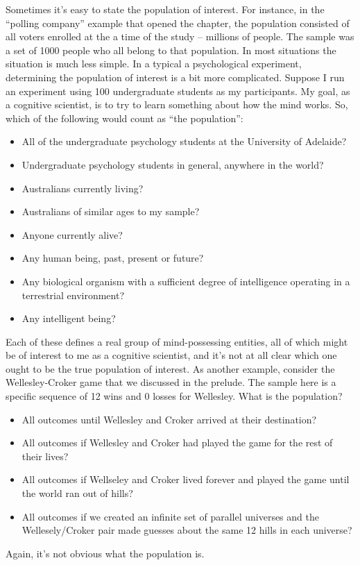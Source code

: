 Sometimes it's easy to state the population of interest. For instance, in the ``polling company'' example that opened the chapter, the population consisted of all  voters enrolled at the a time of the study -- millions of people. The sample was a set of 1000 people who all belong to that population. In most situations the situation is much less simple. In a typical a psychological experiment, determining the population of interest is a bit more complicated. Suppose I run an experiment using 100 undergraduate students as my participants. My goal, as a cognitive scientist, is to try to learn something about how the mind works. So, which of the following would count as ``the population'':
\begin{itemize} \itemsep -2pt
\item All of the undergraduate psychology students at the University of Adelaide?
\item Undergraduate psychology students in general, anywhere in the world?
\item Australians currently living?
\item Australians of similar ages to my sample?
\item Anyone currently alive?
\item Any human being, past, present or future?
\item Any biological organism with a sufficient degree of intelligence operating in a terrestrial environment?
\item Any intelligent being?
\end{itemize}
Each of these defines a real group of mind-possessing entities, all of which might be of interest to me as a cognitive scientist, and it's not at all clear which one ought to be the true population of interest. As another example, consider the Wellesley-Croker game that we discussed in the prelude. The sample here is a specific sequence of 12 wins and 0 losses for Wellesley. What is the population?
\begin{itemize} \itemsep -2pt
\item All outcomes until Wellesley and Croker arrived at their destination?
\item All outcomes if Wellesley and Croker had played the game for the rest of their lives?
\item All outcomes if Wellseley and Croker lived forever and played the game until the world ran out of hills?
\item All outcomes if we created an infinite set of parallel universes and the Wellesely/Croker pair made guesses about the same 12 hills in each universe?
\end{itemize}
Again, it's not obvious what the population is.

